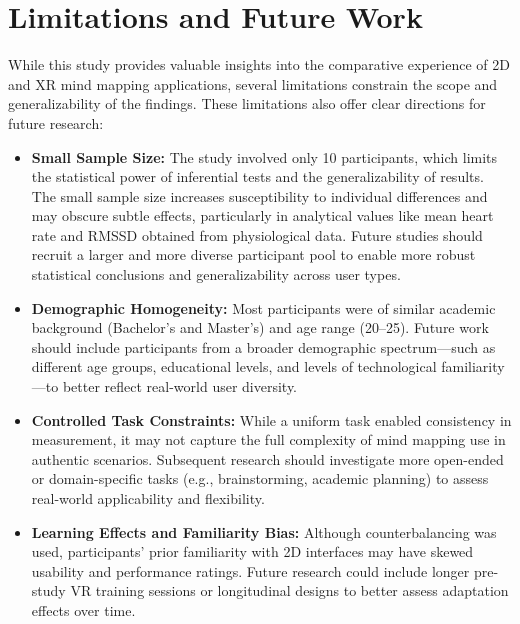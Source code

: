 \documentclass{CPP}
\begin{document}


\section{Limitations and Future Work}

While this study provides valuable insights into the comparative experience of 2D and XR mind mapping applications, several limitations constrain the scope and generalizability of the findings. These limitations also offer clear directions for future research:

\begin{itemize}
    \item \textbf{Small Sample Size:} The study involved only 10 participants, which limits the statistical power of inferential tests and the generalizability of results. The small sample size increases susceptibility to individual differences and may obscure subtle effects, particularly in analytical values like mean heart rate and RMSSD obtained from physiological data. Future studies should recruit a larger and more diverse participant pool to enable more robust statistical conclusions and generalizability across user types.

    \item \textbf{Demographic Homogeneity:} Most participants were of similar academic background (Bachelor's and Master's) and age range (20--25). Future work should include participants from a broader demographic spectrum—such as different age groups, educational levels, and levels of technological familiarity—to better reflect real-world user diversity.

    \item \textbf{Controlled Task Constraints:} While a uniform task enabled consistency in measurement, it may not capture the full complexity of mind mapping use in authentic scenarios. Subsequent research should investigate more open-ended or domain-specific tasks (e.g., brainstorming, academic planning) to assess real-world applicability and flexibility.

    \item \textbf{Learning Effects and Familiarity Bias:} Although counterbalancing was used, participants' prior familiarity with 2D interfaces may have skewed usability and performance ratings. Future research could include longer pre-study VR training sessions or longitudinal designs to better assess adaptation effects over time.


\end{itemize}
\end{document}
